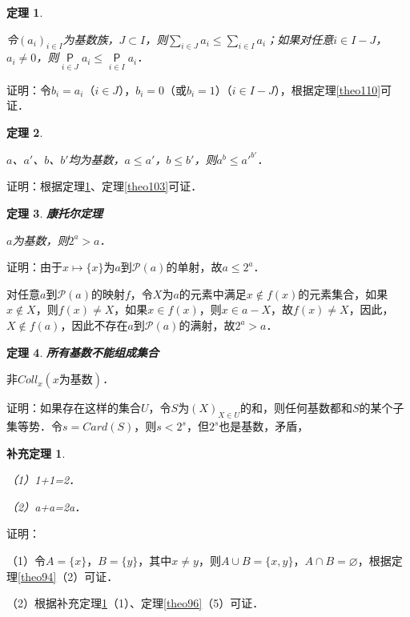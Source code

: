 \documentclass[12pt, a4paper, oneside]{book}
\newtheorem{theo}{定理}
\newtheorem{cor}{补充定理}
\begin{document}
			\begin{theo}\label{theo111}
				\hfill\par
				令$(a_i)_{i\in I}$为基数族，$J\subset I$，则$\sum\limits_{i\in J}a_i\leq \sum\limits_{i\in I}a_i$；如果对任意$i\in I-J$，$a_i\neq 0$，则$\mathop{\mathsf{P}}\limits_{i\in J}a_i\leq \mathop{\mathsf{P}}\limits_{i\in I}a_i$．
			\end{theo}
			证明：令$b_i=a_i$（$i\in J$），$b_i=0$（或$b_i=1$）（$i\in I-J$），根据定理\ref{theo110}可证．
						
			\begin{theo}\label{theo112}
				\hfill\par
				$a$、$a'$、$b$、$b'$均为基数，$a\leq a'$，$b\leq b'$，则$a^b\leq {a'}^{b'}$．
			\end{theo}
			证明：根据定理\ref{theo111}、定理\ref{theo103}可证．
						
			\begin{theo}\label{theo113}
				\textbf{康托尔定理}
				\par
				$a$为基数，则$2^a>a$．
			\end{theo}
			证明：由于$x\mapsto \{x\}$为$a$到$\mathcal{P}(a)$的单射，故$a\leq 2^a$．
			\par
			对任意$a$到$\mathcal{P}(a)$的映射$f$，令$X$为$a$的元素中满足$x\notin f(x)$的元素集合，如果$x\notin X$，则$f(x)\neq X$，如果$x\in f(x)$，则$x\in a-X$，故$f(x)\neq X$，因此，$X\notin f(a)$，因此不存在$a$到$\mathcal{P}(a)$的满射，故$2^a>a$．
						
			\begin{theo}\label{theo114}
				\textbf{所有基数不能组成集合}
				\par
				$\text{非}Coll_x(x\text{为基数})$．	
			\end{theo}
			证明：如果存在这样的集合$U$，令$S$为$(X)_{X\in U}$的和，则任何基数都和$S$的某个子集等势．令$s=Card(S)$，则$s<2^s$，但$2^s$也是基数，矛盾，
			
			\begin{cor}\label{cor299}
				\hfill\par
				（1）1+1=2．
				\par
				（2）a+a=2a．
			\end{cor}
			证明：
			\par
			（1）令$A=\{x\}$，$B=\{y\}$，其中$x\neq y$，则$A\cup B=\{x, y\}$，$A\cap B=\varnothing$，根据定理\ref{theo94}（2）可证．
			\par
			（2）根据补充定理\ref{cor299}（1）、定理\ref{theo96}（5）可证．
						
\end{document}
